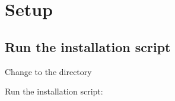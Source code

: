 \documentclass[a4paper,10pt,english]{report}
\begin{document}
\section{Setup}
\label{\detokenize{user/installation:setup}}\label{\detokenize{user/installation:installation-setup}}

\subsection{Run the installation script}
\label{\detokenize{user/installation:run-the-installation-script}}
Change to the  directory

Run the installation script:

\begin{sphinxVerbatim}[commandchars=\\\{\}]
 
\end{sphinxVerbatim}
\end{document}
